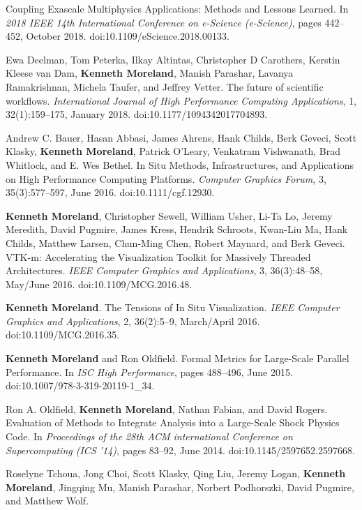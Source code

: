 \begin{enumerate}[label={[\arabic*]}, left=0pt]
  Coupling Exascale Multiphysics Applications: Methods and Lessons Learned.
  In \emph{2018 IEEE 14th International Conference on e-Science (e-Science)}, pages 442--452, October 2018.
  doi:10.1109/eScience.2018.00133.
\item  %
  Ewa Deelman, Tom Peterka, Ilkay Altintas, Christopher D Carothers, Kerstin Kleese van Dam, \textbf{Kenneth Moreland}, Manish Parashar, Lavanya Ramakrishnan, Michela Taufer, and Jeffrey Vetter.
  The future of scientific workflows.
  \emph{International Journal of High Performance Computing Applications}, 1, 32(1):159--175, January 2018.
  doi:10.1177/1094342017704893.
\item  %
  Andrew C. Bauer, Hasan Abbasi, James Ahrens, Hank Childs, Berk Geveci, Scott Klasky, \textbf{Kenneth Moreland}, Patrick O'Leary, Venkatram Vishwanath, Brad Whitlock, and E. Wes Bethel.
  In Situ Methods, Infrastructures, and Applications on High Performance Computing Platforms.
  \emph{Computer Graphics Forum}, 3, 35(3):577--597, June 2016.
  doi:10.1111/cgf.12930.
\item  %
  \textbf{Kenneth Moreland}, Christopher Sewell, William Usher, Li-Ta Lo, Jeremy Meredith, David Pugmire, James Kress, Hendrik Schroots, Kwan-Liu Ma, Hank Childs, Matthew Larsen, Chun-Ming Chen, Robert Maynard, and Berk Geveci.
  {VTK-m}: Accelerating the Visualization Toolkit for Massively Threaded Architectures.
  \emph{IEEE Computer Graphics and Applications}, 3, 36(3):48--58, May/June 2016.
  doi:10.1109/MCG.2016.48.
\item  %
  \textbf{Kenneth Moreland}.
  The Tensions of In Situ Visualization.
  \emph{IEEE Computer Graphics and Applications}, 2, 36(2):5--9, March/April 2016.
  doi:10.1109/MCG.2016.35.
\item  %
  \textbf{Kenneth Moreland} and Ron Oldfield.
  Formal Metrics for Large-Scale Parallel Performance.
  In \emph{ISC High Performance}, pages 488--496, June 2015.
  doi:10.1007/978-3-319-20119-1\_34.
\item  %
  Ron A. Oldfield, \textbf{Kenneth Moreland}, Nathan Fabian, and David Rogers.
  Evaluation of Methods to Integrate Analysis into a Large-Scale Shock Physics Code.
  In \emph{Proceedings of the 28th ACM international Conference on Supercomputing (ICS '14)}, pages 83--92, June 2014.
  doi:10.1145/2597652.2597668.
\item  %
  Roselyne Tchoua, Jong Choi, Scott Klasky, Qing Liu, Jeremy Logan, \textbf{Kenneth Moreland}, Jingqing Mu, Manish Parashar, Norbert Podhorszki, David Pugmire, and Matthew Wolf.

\end{enumerate}
